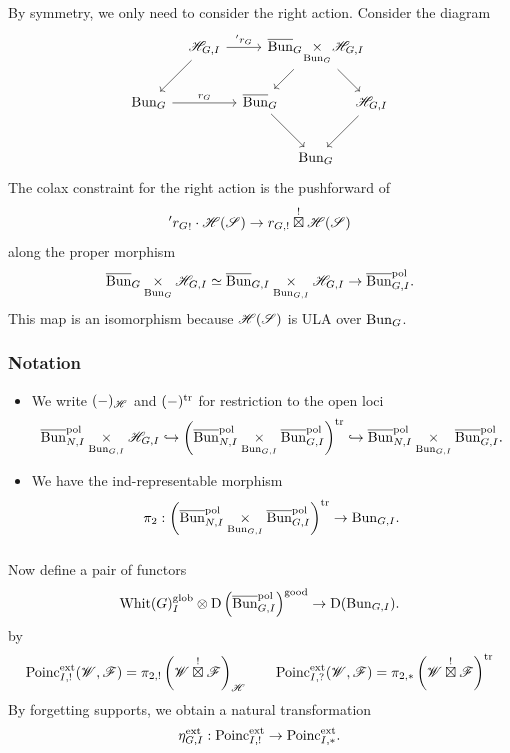 \subsubsection{} By symmetry, we only need to consider the right action. Consider the diagram
\[
\begin{tikzcd}[
  column sep={4em,between origins},
  row sep={4em,between origins}
]
    & \HH_{G,I} \arrow[dl] \arrow[rr, "\aph r_G"] & & \Bunc_G \!\underset{\Bun_G}{\times}\! \HH_{G,I} \arrow[dl] \arrow[dr] & \\
    \Bun_G \arrow[rr, "r_G"] & & \Bunc_G \arrow[dr] & & \HH_{G,I} \arrow[dl] \\
     & & & \Bun_G &
\end{tikzcd}
\]
The colax constraint for the right action is the pushforward of
  \[{{'} r_G}_! \cdot \mathscr{H}(\mathscr{S}) \to r_{G,!} \overset{!}{\boxtimes} \mathscr{H}(\mathscr{S}) \]
along the proper morphism
\[
    \overline{\mathrm{Bun}}_G \underset{\mathrm{Bun}_G}{\times} \mathscr{H}_{G,I} 
    \simeq \overline{\mathrm{Bun}}_{G,I} \underset{\mathrm{Bun}_{G,I}}{\times} \mathscr{H}_{G,I}
    \to \overline{\mathrm{Bun}}_{G,I}^{\mathrm{pol}}.
\]
This map is an isomorphism because $\mathscr{H}(\mathscr{S})$ is ULA over $\mathrm{Bun}_G$.

\subsubsection{Notation} 
\begin{itemize}
    \item We write $(-)_{\mathscr{H}}$ and $(-)^{\mathrm{tr}}$ for restriction to the open loci
\[
    \overline{\mathrm{Bun}}_{N,I}^{\mathrm{pol}} \underset{\mathrm{Bun}_{G,I}}{\times} \mathscr{H}_{G,I}
    \hookrightarrow \left(\overline{\mathrm{Bun}}_{N,I}^{\mathrm{pol}} \underset{\mathrm{Bun}_{G,I}}{\times} \overline{\mathrm{Bun}}_{G,I}^{\mathrm{pol}} \right)^{\mathrm{tr}} 
    \hookrightarrow \overline{\mathrm{Bun}}_{N,I}^{\mathrm{pol}} \underset{\mathrm{Bun}_{G,I}}{\times} \overline{\mathrm{Bun}}_{G,I}^{\mathrm{pol}}.
\]
    \item We have the ind-representable morphism
    \[
    \pi_2 : \left(\overline{\mathrm{Bun}}_{N,I}^{\mathrm{pol}} \underset{\mathrm{Bun}_{G,I}}{\times} \overline{\mathrm{Bun}}_{G,I}^{\mathrm{pol}} \right)^{\mathrm{tr}}
    \to \mathrm{Bun}_{G,I}.
    \]
\end{itemize}

\subsubsection{} Now define a pair of functors
\[
    \mathrm{Whit}(G)_I^{\mathrm{glob}} \otimes \mathrm{D}\left(\overline{\mathrm{Bun}}_{G,I}^{\mathrm{pol}} \right)^{\mathrm{good}}
    \to \mathrm{D}(\mathrm{Bun}_{G,I}).
\]
by
\[
    \mathrm{Poinc}_{I,!}^{\mathrm{ext}}(\mathscr{W}, \mathscr{F}) = \pi_{2,!} \left( \mathscr{W} \overset{!}{\boxtimes} \mathscr{F} \right)_{\mathscr{H}} \qquad
    \mathrm{Poinc}_{I,?}^{\mathrm{ext}}(\mathscr{W}, \mathscr{F}) = \pi_{2,*} \left( \mathscr{W} \overset{!}{\boxtimes} \mathscr{F} \right)^{\mathrm{tr}}
\]
By forgetting supports, we obtain a natural transformation
  \[\eta_{G,I}^{\mathrm{ext}} : \mathrm{Poinc}_{I,!}^{\mathrm{ext}} \to \mathrm{Poinc}_{I,*}^{\mathrm{ext}}.\]

